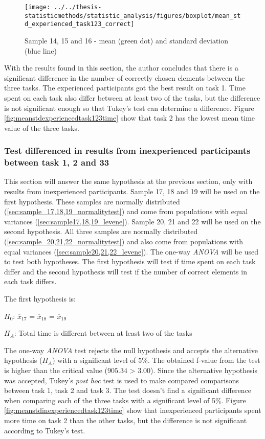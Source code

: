 \begin{figure}[H]
	\centering
	\texttt{[image: ../../thesis-statisticmethods/statistic\_analysis/figures/boxplot/mean\_std\_experienced\_task123\_correct]}
	\caption{Sample 14, 15 and 16 - mean (green dot) and standard deviation (blue line)}
	\label{fig:meanstdexperiencedtask123correct}
\end{figure}

\vspace{0.3cm}

With the results found in this section, the author concludes that there is a significant difference in the number of correctly chosen elements between the three tasks. The experienced participants got the best result on task 1. Time spent on each task also differ between at least two of the tasks, but the difference is not significant enough so that Tukey's test can determine a difference. Figure \ref{fig:meanstdexperiencedtask123time} show that task 2 has the lowest mean time value of the three tasks.  


\subsubsection[Sample 17 -  22]{Test differenced in results from inexperienced participants between task 1, 2 and 33}\label{sec:sample_17_18_19_anova}

This section will answer the same hypothesis at the previous section, only with results from inexperienced participants. Sample 17, 18 and 19 will be used on the first hypothesis. These samples are normally distributed (\ref{sec:sample_17,18,19_normalitytest}) and come from populations with equal variances (\ref{sec:sample17,18,19_levene}). Sample 20, 21 and 22 will be used on the second hypothesis. All three samples are normally distributed (\ref{sec:sample_20,21,22_normalitytest}) and also come from populations with equal variances (\ref{sec:sample20,21,22_levene}). The one-way \textit{ANOVA} will be used to test both hypotheses. The first hypothesis will test if time spent on each task differ and the second hypothesis will test if the number of correct elements in each task differs.

The first hypothesis is:\\
\centerline{$H_{0}$: $\overline{x}_{17}$ = $\overline{x}_{18}$ = $\overline{x}_{19}$}
\centerline{$H_{A}$: Total time is different between at least two of the tasks}

The one-way \textit{ANOVA} test rejects the null hypothesis and accepts the alternative hypothesis ($H_{A}$) with a significant level of 5\%. The obtained f-value from the test is higher than the critical value ($905.34$ > $3.00$). Since the alternative hypothesis was accepted, Tukey's \textit{post hoc} test is used to make compared comparisons between task 1, task 2 and task 3. The test doesn't find a significant difference when comparing each of the three tasks with a significant level of 5\%. Figure \ref{fig:meanstdinexperiencedtask123time} show that inexperienced participants spent more time on task 2 than the other tasks, but the difference is not significant according to Tukey's test.

